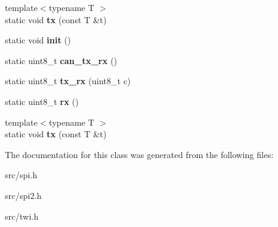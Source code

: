 \begin{DoxyCompactItemize}
\item 
{\footnotesize template$<$typename T $>$ }\\static void {\bfseries tx} (const T \&t)\hypertarget{classSpiSync_aa964af94bb9f7a91f2a878ea7ca879c5}{}\label{classSpiSync_aa964af94bb9f7a91f2a878ea7ca879c5}

\item 
static void {\bfseries init} ()\hypertarget{classSpiSync_a07378e5e4ae000daa27ed58b1feeff0e}{}\label{classSpiSync_a07378e5e4ae000daa27ed58b1feeff0e}

\item 
static uint8\+\_\+t {\bfseries can\+\_\+tx\+\_\+rx} ()\hypertarget{classSpiSync_a224c0b96e99813940a1f28ea1ccf1702}{}\label{classSpiSync_a224c0b96e99813940a1f28ea1ccf1702}

\item 
static uint8\+\_\+t {\bfseries tx\+\_\+rx} (uint8\+\_\+t c)\hypertarget{classSpiSync_a8506142258c37b77e4b7e9cc3b9cb849}{}\label{classSpiSync_a8506142258c37b77e4b7e9cc3b9cb849}

\item 
static uint8\+\_\+t {\bfseries rx} ()\hypertarget{classSpiSync_a64929149114cd33c268223123b8d3072}{}\label{classSpiSync_a64929149114cd33c268223123b8d3072}

\item 
{\footnotesize template$<$typename T $>$ }\\static void {\bfseries tx} (const T \&t)\hypertarget{classSpiSync_aa964af94bb9f7a91f2a878ea7ca879c5}{}\label{classSpiSync_aa964af94bb9f7a91f2a878ea7ca879c5}

\end{DoxyCompactItemize}


The documentation for this class was generated from the following files\+:\begin{DoxyCompactItemize}
\item 
src/spi.\+h\item 
src/spi2.\+h\item 
src/twi.\+h\end{DoxyCompactItemize}
